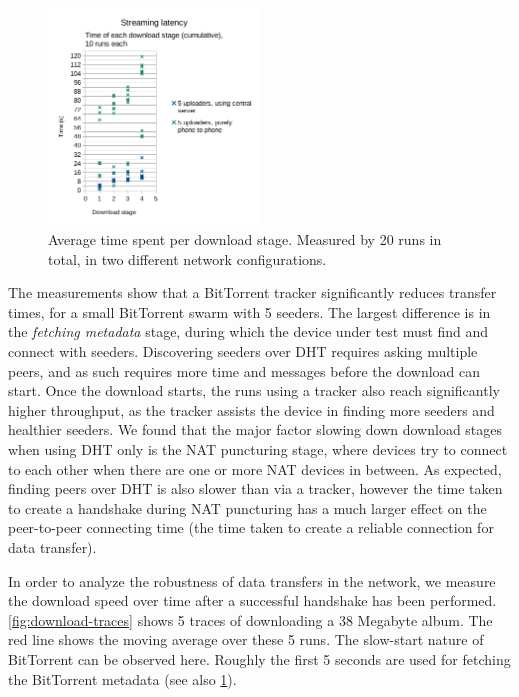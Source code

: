 \begin{figure}
    \centering
    \includegraphics[width=0.5\textwidth]{evaluation/download-times-2.png}
    \caption{Average time spent per download stage. Measured by 20 runs in total, in two different network configurations.}
    \label{fig:download-times}
\end{figure}

The measurements show that a BitTorrent tracker significantly reduces transfer times, for a small BitTorrent swarm with 5 seeders. The largest difference is in the \textit{fetching metadata} stage, during which the device under test must find and connect with seeders. Discovering seeders over DHT requires asking multiple peers, and as such requires more time and messages before the download can start. Once the download starts, the runs using a tracker also reach significantly higher throughput, as the tracker assists the device in finding more seeders and healthier seeders. We found that the major factor slowing down download stages when using DHT only is the NAT puncturing stage, where devices try to connect to each other when there are one or more NAT devices in between. As expected, finding peers over DHT is also slower than via a tracker, however the time taken to create a handshake during NAT puncturing has a much larger effect on the peer-to-peer connecting time (the time taken to create a reliable connection for data transfer). 

In order to analyze the robustness of data transfers in the network, we measure the download speed over time after a successful handshake has been performed. \ref{fig:download-traces} shows 5 traces of downloading a 38 Megabyte album. The red line shows the moving average over these 5 runs. The slow-start nature of BitTorrent can be observed here. Roughly the first 5 seconds are used for fetching the BitTorrent metadata (see also \ref{fig:download-times}). 

